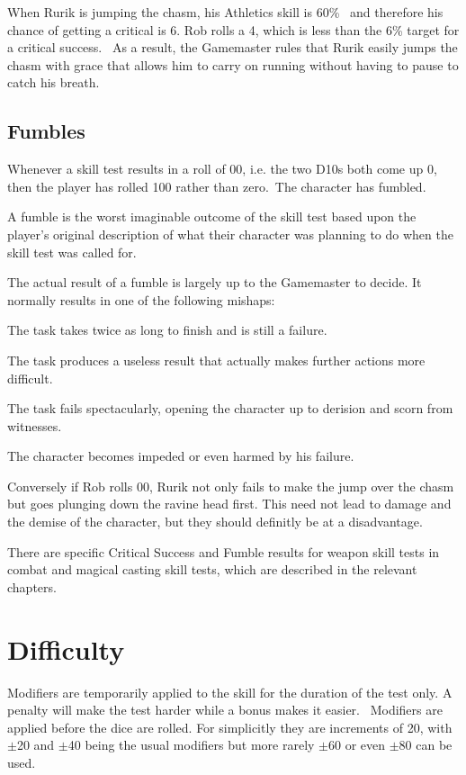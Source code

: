 \begin{rpg-examplebox}
When Rurik is jumping the chasm, his Athletics skill is 60\%  and therefore his chance of getting a critical is 6. Rob rolls a 4, which is less than the 6\% target for a critical success.  As a result, the Gamemaster rules that Rurik easily jumps the chasm with grace that allows him to carry on running without having to pause to catch his breath.
\end{rpg-examplebox}

\subsection{Fumbles}
Whenever a skill test results in a roll of 00, i.e. the two D10s both come up 0, then the player has rolled 100 rather than zero. The character has fumbled. 

A fumble is the worst imaginable outcome of the skill test based upon the player’s original description of what their character was planning to do when the skill test was called for.

The actual result of a fumble is largely up to the Gamemaster to decide. It normally results in one of the following mishaps: 

\begin{rpg-list}
\item The task takes twice as long to finish and is still a failure. 
\item The task produces a useless result that actually makes further actions more difficult. 
\item The task fails spectacularly, opening the character up to derision and scorn from witnesses. 
\item The character becomes impeded or even harmed by his failure. 
\end{rpg-list}

Conversely if Rob rolls 00, Rurik not only fails to make the jump over the chasm but goes plunging down the ravine head first. This need not lead to damage and the demise of the character, but they should definitly be at a disadvantage.

There are specific Critical Success and Fumble results for weapon skill tests in combat and magical casting skill tests, which are described in the relevant chapters.


\section{Difficulty}
Modifiers are temporarily applied to the skill for the duration of the test only. A penalty will make the test harder while a bonus makes it easier.  Modifiers are applied before the dice are rolled. For simplicitly they are increments of 20, with $\pm$20 and $\pm$40 being the usual modifiers but more rarely $\pm$60 or even $\pm$80 can be used.

